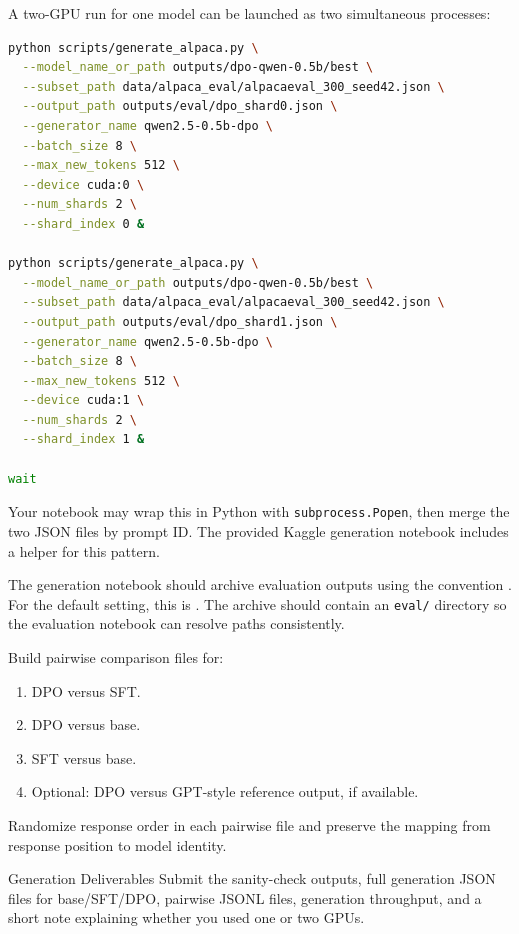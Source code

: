 \documentclass[11pt]{article}
\begin{document}
A two-GPU run for one model can be launched as two simultaneous processes:
\begin{lstlisting}[language=bash]
python scripts/generate_alpaca.py \
  --model_name_or_path outputs/dpo-qwen-0.5b/best \
  --subset_path data/alpaca_eval/alpacaeval_300_seed42.json \
  --output_path outputs/eval/dpo_shard0.json \
  --generator_name qwen2.5-0.5b-dpo \
  --batch_size 8 \
  --max_new_tokens 512 \
  --device cuda:0 \
  --num_shards 2 \
  --shard_index 0 &

python scripts/generate_alpaca.py \
  --model_name_or_path outputs/dpo-qwen-0.5b/best \
  --subset_path data/alpaca_eval/alpacaeval_300_seed42.json \
  --output_path outputs/eval/dpo_shard1.json \
  --generator_name qwen2.5-0.5b-dpo \
  --batch_size 8 \
  --max_new_tokens 512 \
  --device cuda:1 \
  --num_shards 2 \
  --shard_index 1 &

wait
\end{lstlisting}

Your notebook may wrap this in Python with \texttt{subprocess.Popen}, then merge the two JSON files by prompt ID. The provided Kaggle generation notebook includes a helper for this pattern.

The generation notebook should archive evaluation outputs using the convention . For the default setting, this is . The archive should contain an \texttt{eval/} directory so the evaluation notebook can resolve paths consistently.

Build pairwise comparison files for:
\begin{enumerate}[leftmargin=*]
  \item DPO versus SFT.
  \item DPO versus base.
  \item SFT versus base.
  \item Optional: DPO versus GPT-style reference output, if available.
\end{enumerate}
Randomize response order in each pairwise file and preserve the mapping from response position to model identity.

\begin{deliverablebox}{Generation Deliverables}
Submit the sanity-check outputs, full generation JSON files for base/SFT/DPO, pairwise JSONL files, generation throughput, and a short note explaining whether you used one or two GPUs.
\end{deliverablebox}
\end{document}
